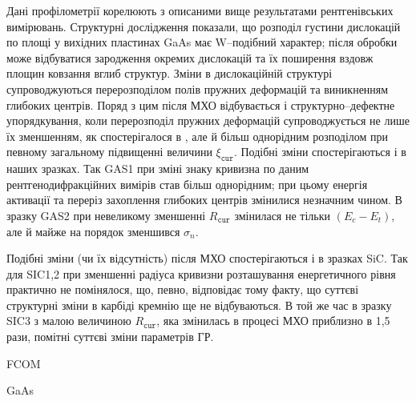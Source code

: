 \documentclass[a4paper,14pt,oneside,openany]{memoir}
\begin{document}
Дані профілометрії корелюють з описаними вище результатами рентгенівських вимірювань.
Структурні дослідження показали, що розподіл густини дислокацій по площі у вихідних пластинах GaAs має W--подібний характер;
після обробки може відбуватися зародження окремих дислокацій та їх поширення вздовж площин ковзання вглиб структур.
Зміни в дислокаційній структурі супроводжуються перерозподілом полів пружних деформацій та виникненням глибоких центрів.
Поряд з цим після МХО відбувається і структурно--дефектне упорядкування, коли
перерозподіл пружних деформацій супроводжується не лише їх зменшенням, як спостерігалося в \cite{Bacherikov2003r,Pashkov1994r,Boltovets,Kr1996,Milenin1994,BelyaevIntac},
але й більш однорідним розподілом при певному загальному підвищенні величини $\xi_\mathtt{cur}$.
Подібні зміни спостерігаються і в наших зразках.
Так GAS1 при зміні знаку кривизна по даним рентгенодифракційних вимірів став більш однорідним;
при цьому енергія активації та переріз захоплення глибоких центрів змінилися незначним чином.
В зразку GAS2 при невеликому зменшенні $R_\mathtt{cur}$ змінилася не тільки $(E_c-E_t)$, але й майже на порядок зменшився $\sigma_n$.

Подібні зміни (чи їх відсутність) після МХО спостерігаються і в зразках SiC.
Так для SIC1,2 при зменшенні радіуса кривизни розташування енергетичного рівня практично не помінялося, що, певно,
відповідає тому  факту, що суттєві структурні зміни в карбіді кремнію ще не відбуваються.
В той же час в зразку  SIC3 з малою величиною $R_\mathtt{cur}$, яка змінилась в процесі МХО приблизно в 1,5 рази,
помітні суттєві зміни параметрів ГР.



\cite{KorshunovBook,Kozlovs,Zaveryukhin2002:2,OlikhFTT,Boltovets,Bacherikov2003r,Belyaev1998JTFr,Saiko1993,OlikhSSC,
Rzanov,Shishiyanu,Vaitkus,Samoilov1994,ZOHM2000}

FCOM
\cite{Rjanov1981,paton1993,Vinnik1989,ZOHM2000,BHUNIA1998,Bacherikov2003r,Pashkov1994r,Boltovets,Kr1996,Milenin1994,
BelyaevIntac,ASHKINADZE1996,ProcSPIE,Venger1999,Godwod,ThoricBook,BergBook,Lebed1999,Anikin1991:2,
Anikin1991:3,Lebedev2001}





GaAs
\cite{Neild1991}
\end{document}
